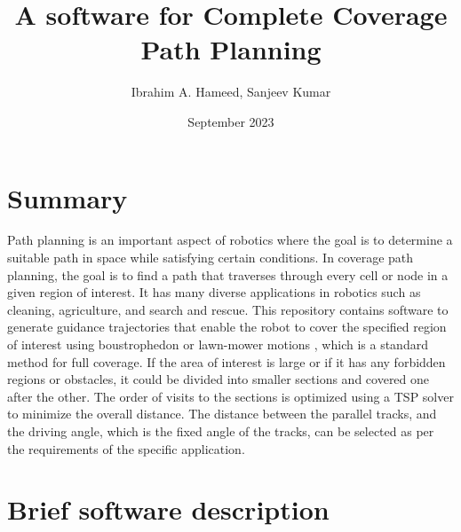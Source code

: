 \documentclass{article}
\title{A software for Complete Coverage Path Planning}
\author{Ibrahim A. Hameed, Sanjeev Kumar}
\date{September 2023}
\begin{document}
\maketitle
\section{Summary}
Path planning is an important aspect of robotics where the goal is to determine a suitable path in space while satisfying certain conditions. In coverage path planning, the goal is to find a path that traverses through every cell or node in a given region of interest. It has many diverse applications in robotics such as cleaning, agriculture, and search and rescue. This repository contains software to generate guidance trajectories that enable the robot to cover the specified region of interest using boustrophedon or lawn-mower motions \cite{choset1998coverage}, which is a standard method for full coverage. If the area of interest is large or if it has any forbidden regions or obstacles, it could be divided into smaller sections and covered one after the other. The order of visits to the sections is optimized using a TSP solver to minimize the overall distance. The distance between the parallel tracks, and the driving angle, which is the fixed angle of the tracks, can be selected as per the requirements of the specific application.  

\section{Brief software description}
\end{document}
